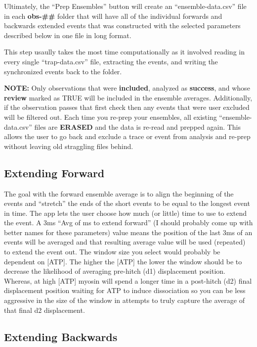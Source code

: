 \documentclass[
]{book}
\begin{document}
Ultimately, the ``Prep Ensembles'' button will create an ``ensemble-data.csv'' file in each \textbf{obs-\#\#} folder that will have all of the individual forwards and backwards extended events that was constructed with the selected parameters described below in one file in long format.

This step usaully takes the most time computationally as it involved reading in every single ``trap-data.csv'' file, extracting the events, and writing the synchronized events back to the folder.

\textbf{NOTE:} Only observations that were \textbf{included}, analyzed as \textbf{success}, and whose \textbf{review} marked as TRUE will be included in the ensemble averages. Additionally, if the observation passes that first check then any events that were user excluded will be filtered out. Each time you re-prep your ensembles, all existing ``ensemble-data.csv'' files are \textbf{ERASED} and the data is re-read and prepped again. This allows the user to go back and exclude a trace or event from analysis and re-prep without leaving old straggling files behind.

\subsection{Extending Forward}\label{extending-forward}

The goal with the forward ensemble average is to align the beginning of the events and ``stretch'' the ends of the short events to be equal to the longest event in time. The app lets the user choose how much (or little) time to use to extend the event. A 3ms ``Avg of ms to extend forward'' (I should probably come up with better names for these parameters) value means the position of the last 3ms of an events will be averaged and that resulting average value will be used (repeated) to extend the event out. The window size you select would probably be dependent on {[}ATP{]}. The higher the {[}ATP{]} the lower the window should be to decrease the likelihood of averaging pre-hitch (d1) displacement position. Whereas, at high {[}ATP{]} myosin will spend a longer time in a post-hitch (d2) final displacement position waiting for ATP to induce dissociation so you can be less aggressive in the size of the window in attempts to truly capture the average of that final d2 displacement.

\subsection{Extending Backwards}\label{extending-backwards}
\end{document}
